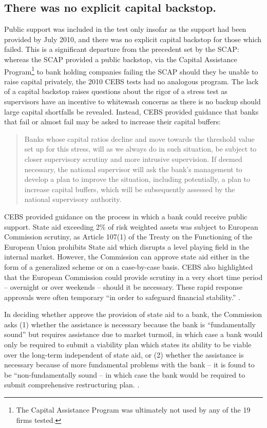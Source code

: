 \documentclass[12pt]{article}
\begin{document}
\subsection{There was no explicit capital backstop.}

Public support was included in the test only insofar as the support had been provided by July 2010, and there was no explicit capital backstop for those which failed. This is a significant departure from the precedent set by the SCAP: whereas the SCAP provided a public backstop, via the Capital Assistance Program\footnote{The Capital Assistance Program was ultimately not used by any of the 19 firms tested.} to bank holding companies failing the SCAP should they be unable to raise capital privately, the 2010 CEBS tests had no analogous program. The lack of a capital backstop raises questions about the rigor of a stress test as supervisors have an incentive to whitewash concerns as there is no backup should large capital shortfalls be revealed.  Instead, CEBS provided guidance that banks that fail or almost fail may be asked to increase their capital buffers:

\begin{quote}
Banks whose capital ratios decline and move towards the threshold value set up for this stress, will as we always do in such situation, be subject to closer supervisory scrutiny and more intrusive supervision. If deemed necessary, the national supervisor will ask the bank’s management to develop a plan to improve the situation, including potentially, a plan to increase capital buffers, which will be subsequently assessed by the national supervisory authority.
\end{quote}

CEBS provided guidance on the process in which a bank could receive public support. State aid exceeding 2\% of risk weighted assets was subject to European Commission scrutiny, as Article 107(1) of the Treaty on the Functioning of the European Union prohibits State aid which disrupts a level playing field in the internal market. However, the Commission can approve state aid either in the form of a generalized scheme or on a case-by-case basis. CEBS also highlighted that the European Commission could provide scrutiny in a very short time period -- overnight or over weekends -- should it be necessary. These rapid response approvals were often temporary ``in order to safeguard financial stability.'' \citep{QA}.

In deciding whether approve the provision of state aid to a bank, the Commission asks (1) whether the assistance is necessary because the bank is ``fundamentally sound'' but requires assistance due to market turmoil, in which case a bank would only be required to submit a viability plan which states its ability to be viable over the long-term independent of state aid, or (2) whether the assistance is necessary because of more fundamental problems with the bank -- it is found to be ``non-fundamentally sound --  in which case the bank would be required to submit comprehensive restructuring plan. \citep{QA}.
\end{document}
